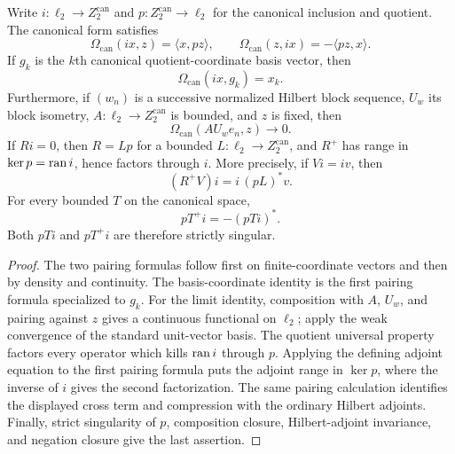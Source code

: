 \begin{lemma}
\label{lem:canonical-exact-sequence-adjoint-bridges}
Write $i:\ell_2\to Z_2^{\mathrm{can}}$ and
$p:Z_2^{\mathrm{can}}\to\ell_2$ for the canonical inclusion and quotient.  The canonical form
satisfies
\[
  \Omega_{\mathrm{can}}(ix,z)=\langle x,pz\rangle,
  \qquad
  \Omega_{\mathrm{can}}(z,ix)=-\langle pz,x\rangle .
\]
If $g_k$ is the $k$th canonical quotient-coordinate basis vector, then
\[
  \Omega_{\mathrm{can}}(ix,g_k)=x_k.
\]
Furthermore, if $(w_n)$ is a successive normalized Hilbert block sequence, $U_w$ its block
isometry, $A:\ell_2\to Z_2^{\mathrm{can}}$ is bounded, and $z$ is fixed, then
\[
  \Omega_{\mathrm{can}}(AU_we_n,z)\longrightarrow0.
\]
If $Ri=0$, then $R=Lp$ for a bounded $L:\ell_2\to Z_2^{\mathrm{can}}$, and $R^+$ has range in
$\ker p=\operatorname{ran} i$, hence factors through $i$.  More precisely, if $Vi=iv$, then
\[
  (R^+V)i=i\,(pL)^*v.
\]
For every bounded $T$ on the canonical space,
\[
  pT^+i=-(pTi)^*.
\]
Both $pTi$ and $pT^+i$ are therefore strictly singular.
\leanok
\end{lemma}

\begin{proof}
The two pairing formulas follow first on finite-coordinate vectors and then by density and
continuity.  The basis-coordinate identity is the first pairing formula specialized to $g_k$.
For the limit identity, composition with $A$, $U_w$, and pairing against $z$ gives a continuous
functional on $\ell_2$; apply the weak convergence of the standard unit-vector basis.  The
quotient universal property factors every operator which kills $\operatorname{ran} i$ through $p$.  Applying
the defining adjoint equation to the first pairing formula puts the adjoint range
in $\ker p$, where the inverse of $i$ gives the second factorization.  The same pairing calculation
identifies the displayed cross term and compression with the ordinary Hilbert adjoints.  Finally,
strict singularity of $p$, composition closure, Hilbert-adjoint invariance, and negation closure
give the last assertion.
\end{proof}

